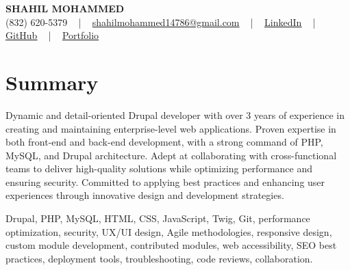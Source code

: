 \documentclass[letterpaper,10pt]{article}
\begin{document}
\begin{center}
    {\fontsize{14pt}{12pt}\selectfont \textbf{\MakeUppercase{Shahil Mohammed}}}\\ \vspace{2pt}
    \fontsize{10pt}{12pt}\selectfont (832) 620-5379 ~ | ~ \href{mailto:shahilmohammed14786@gmail.com}{shahilmohammed14786@gmail.com} ~ | ~  
    \href{https://www.linkedin.com/in/shahil-mohammed-9652931a1/}{\color{blue}\underline{LinkedIn}}  ~ | ~ 
    \href{https://github.com/freakbeast14}{\color{blue}\underline{GitHub}} ~ | ~ 
    \href{https://shahil-mohammed.netlify.app/}{\color{blue}\underline{Portfolio}}
    \vspace{-8pt}
\end{center}

\section{Summary}
\vspace{-2pt}\fontsize{8pt}{9pt}\selectfont
Dynamic and detail-oriented Drupal developer with over 3 years of experience in creating and maintaining enterprise-level web applications. Proven expertise in both front-end and back-end development, with a strong command of PHP, MySQL, and Drupal architecture. Adept at collaborating with cross-functional teams to deliver high-quality solutions while optimizing performance and ensuring security. Committed to applying best practices and enhancing user experiences through innovative design and development strategies.
\vspace{-5pt}

{\fontsize{1pt}{1pt}\selectfont\color{white}
Drupal, PHP, MySQL, HTML, CSS, JavaScript, Twig, Git, performance optimization, security, UX/UI design, Agile methodologies, responsive design, custom module development, contributed modules, web accessibility, SEO best practices, deployment tools, troubleshooting, code reviews, collaboration.
}
\vspace{-8pt}

\vspace{-2pt}
\end{document}
